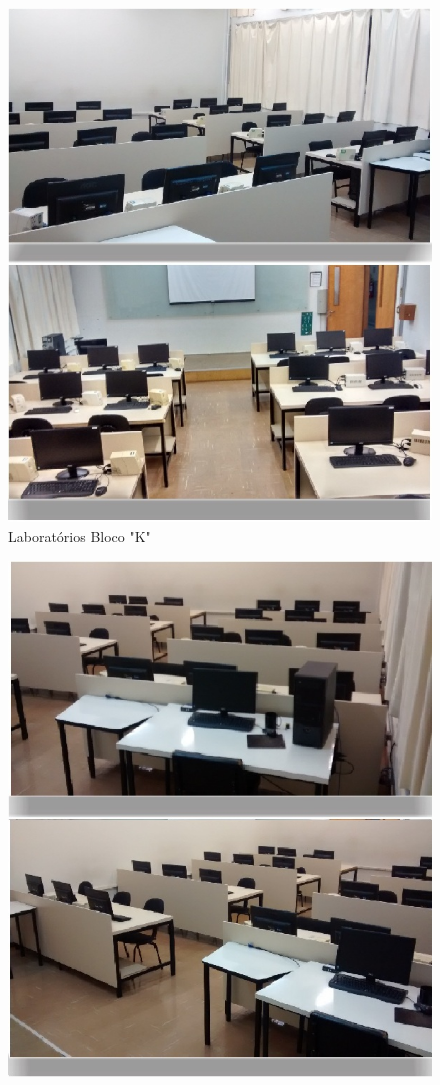 \documentclass[	DIV=calc,%
							paper=a4,%
							fontsize=12pt,%
							onecolumn]{scrartcl}	 					%
\begin{document}
\begin{figure}[!h]
	\centering
	\caption{Laboratórios Bloco "K"}
	\includegraphics{laboratorios_1}
\end{figure}
\begin{figure}[!h]
	\centering
	\includegraphics{laboratorios_2}
\end{figure}
\end{document}
